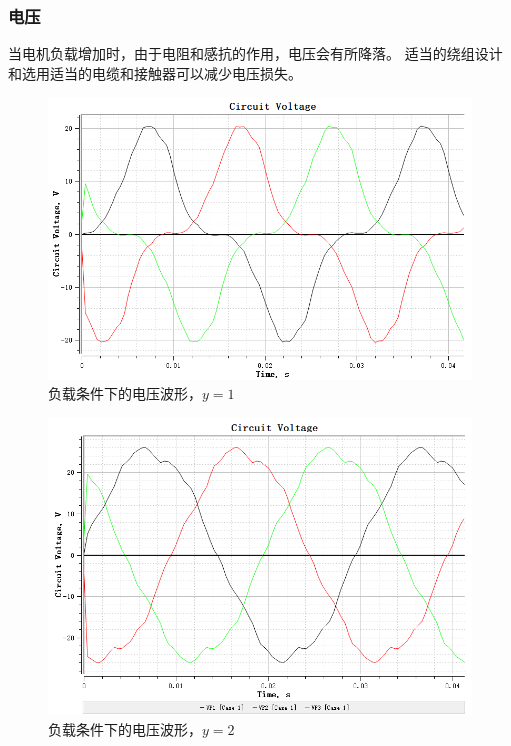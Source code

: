 \documentclass{thuemp}
\begin{document}
\subsubsection{电压}
当电机负载增加时，由于电阻和感抗的作用，电压会有所降落。
适当的绕组设计和选用适当的电缆和接触器可以减少电压损失。
\begin{figure}[H]
  \centering
  \includegraphics[width=1\linewidth]{./img/task2/voltage-y1-load.png}
  \caption{负载条件下的电压波形，$y=1$}
\end{figure}
\begin{figure}[H]
  \centering
  \includegraphics[width=1\linewidth]{./img/task2/voltage-y2-load.png}
  \caption{负载条件下的电压波形，$y=2$}
\end{figure}
\end{document}
